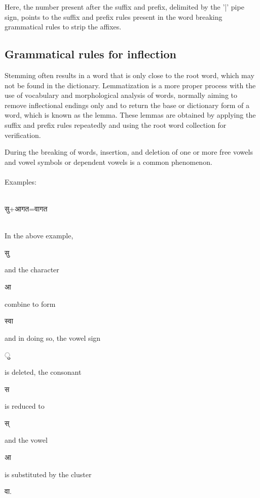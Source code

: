 \documentclass[conference]{IEEEtran}
\begin{document}
\medskip
Here, the number present after the suffix and prefix, delimited by the '|' pipe
sign, points to the suffix and prefix rules present in the word breaking
grammatical rules to strip the affixes.
\medskip


\subsection{Grammatical rules for inflection}

Stemming often results in a word that is only close to the root word, which may
not be found in the dictionary. Lemmatization is a more proper process with the
use of vocabulary and morphological analysis of words, normally aiming to remove
inflectional endings only and to return the base or dictionary form of a word, 
which is known as the lemma. These lemmas are obtained by applying the suffix 
and prefix rules repeatedly and using the root word collection for verification.

During the breaking of words, insertion, and deletion of one or more free
vowels and vowel symbols or dependent vowels is a
common phenomenon.\\\\
Examples:\\\\
\begin{sanskrit}
सु+आगत=वागत
\end{sanskrit}\\

In the above example, \begin{sanskrit}सु \end{sanskrit} and the character
\begin{sanskrit}आ \end{sanskrit} combine to form \begin{sanskrit}स्वा
\end{sanskrit}
and in doing so, the vowel sign \begin{sanskrit}◌ु \end{sanskrit} is deleted, the
consonant \begin{sanskrit}स \end{sanskrit} is reduced to \begin{sanskrit}स् 
\end{sanskrit} and the vowel \begin{sanskrit}आ \end{sanskrit} is substituted by
the cluster \begin{sanskrit}वा. \end{sanskrit}
\end{document}

